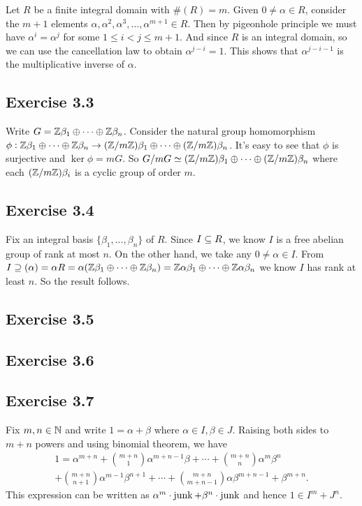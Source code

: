 \documentclass[../Marcus.tex]{subfiles}
\begin{document}
Let $R$ be a finite integral domain with $\#(R)=m$. Given $0\neq\alpha\in R$, consider the $m+1$ elements $\alpha,\alpha^2,\alpha^3,\ldots,\alpha^{m+1}\in R$. Then by pigeonhole principle we must have $\alpha^i=\alpha^j$ for some $1\leq i<j \leq m+1$. And since $R$ is an integral domain, so we can use the cancellation law to obtain $\alpha^{j-i}=1$. This shows that $\alpha^{j-i-1}$ is the multiplicative inverse of $\alpha$.

\subsection*{Exercise 3.3}

Write $G=\mathbb{Z}\beta_1\oplus\cdots\oplus\mathbb{Z}\beta_n$. Consider the natural group homomorphism $\phi:\mathbb{Z}\beta_1\oplus\cdots\oplus\mathbb{Z}\beta_n \to (\mathbb{Z}/m\mathbb{Z})\beta_1\oplus\cdots\oplus(\mathbb{Z}/m\mathbb{Z})\beta_n$. It's easy to see that $\phi$ is surjective and $\ker\phi=mG$. So $G/mG\simeq (\mathbb{Z}/m\mathbb{Z})\beta_1\oplus\cdots\oplus(\mathbb{Z}/m\mathbb{Z})\beta_n$ where each $(\mathbb{Z}/m\mathbb{Z})\beta_i$ is a cyclic group of order $m$.

\subsection*{Exercise 3.4}

Fix an integral basis $\{\beta_1,\ldots,\beta_n\}$ of $R$. Since $I \subseteq R$, we know $I$ is a free abelian group of rank at most $n$. On the other hand, we take any  $0 \neq \alpha \in I$. From $I \supseteq (\alpha)=\alpha R = \alpha(\mathbb{Z}\beta_1\oplus\cdots\oplus\mathbb{Z}\beta_n) = \mathbb{Z}\alpha\beta_1\oplus\cdots\oplus\mathbb{Z}\alpha\beta_n$ we know $I$ has rank at least $n$. So the result follows.

\subsection*{Exercise 3.5}

\subsection*{Exercise 3.6}

\subsection*{Exercise 3.7}

Fix $m,n\in\mathbb{N}$ and write $1=\alpha+\beta$ where $\alpha\in I,\beta\in J$. Raising both sides to $m+n$ powers and using binomial theorem, we have
\begin{multline*}
    1=\alpha^{m+n}+\binom{m+n}{1}\alpha^{m+n-1}\beta+\cdots+\binom{m+n}{n}\alpha^m\beta^n \\ +\binom{m+n}{n+1}\alpha^{m-1}\beta^{n+1}+\cdots+\binom{m+n}{m+n-1}\alpha\beta^{m+n-1}+\beta^{m+n}.
\end{multline*}
This expression can be written as $\alpha^m\cdot\operatorname{junk} + \beta^n\cdot\operatorname{junk}$ and hence $1\in I^m+J^n$.
\end{document}
